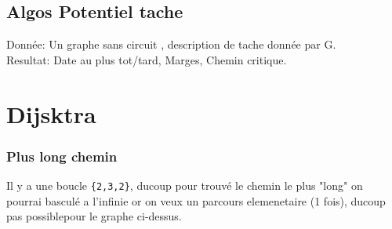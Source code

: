 \documentclass[a4paper,12pt,openany]{book}
\begin{document}

\section{Algos Potentiel tache}
Donnée: Un graphe sans circuit , description de tache donnée par G.\\
Resultat: Date au plus tot/tard, Marges, Chemin critique.\\


\chapter{Dijsktra}

\subsection{Plus long chemin}
Il y a une boucle \verb+{2,3,2}+, ducoup pour trouvé le chemin le plus "long" on pourrai basculé a l'infinie or on veux un parcours elemenetaire (1 fois), ducoup pas possiblepour le graphe ci-dessus.\\
\end{document}
